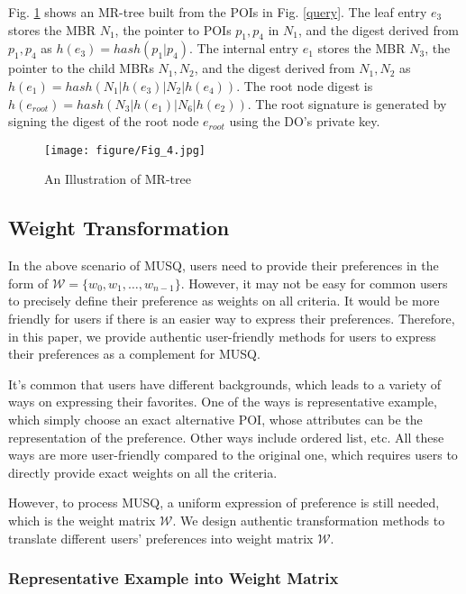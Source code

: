 \documentclass[10pt, conference, compsocconf]{IEEEtran}
\begin{document}
Fig. \ref{VoMR} shows an MR-tree built from the POIs in Fig. \ref{query}. The leaf entry $e_3$ stores the MBR $N_1$, the pointer to POIs $p_1, p_4$ in $N_1$, and the digest derived from $p_1, p_4$ as $h(e_3) = hash(p_1|p_4)$. The internal entry $e_1$ stores the MBR $N_3$, the pointer to the child MBRs $N_1, N_2$, and the digest derived from $N_1, N_2$ as $h(e_1) = hash(N_1 | h(e_3) | N_2 | h(e_4))$. The root node digest is $h(e_{root}) = hash(N_3 | h(e_1) | N_6 | h(e_2))$. The root signature is generated by signing the digest of the root node $e_{root}$ using the DO's private key.

\begin{figure}[htbp]
	\centering
	\texttt{[image: figure/Fig\_4.jpg]}
	\caption{An Illustration of MR-tree}\label{VoMR}
\end{figure}


\subsection{Weight Transformation}\label{WeightTransformation}

In the above scenario of MUSQ, users need to provide their preferences in the form of $\mathcal{W} = \{w_0, w_1, \ldots, w_{n-1}\}$. However, it may not be easy for common users to precisely define their preference as weights on all criteria. It would be more friendly for users if there is an easier way to express their preferences. Therefore, in this paper, we provide authentic user-friendly methods for users to express their preferences as a complement for MUSQ.

It's common that users have different backgrounds, which leads to a variety of ways on expressing their favorites. One of the ways is representative example, which simply choose an exact alternative POI, whose attributes can be the representation of the preference. Other ways include ordered list, etc. All these ways are more user-friendly compared to the original one, which requires users to directly provide exact weights on all the criteria.

However, to process MUSQ, a uniform expression of preference is still needed, which is the weight matrix $\mathcal{W}$. We design authentic transformation methods to translate different users' preferences into weight matrix $\mathcal{W}$. 

\subsubsection{Representative Example into Weight Matrix}
\end{document}
